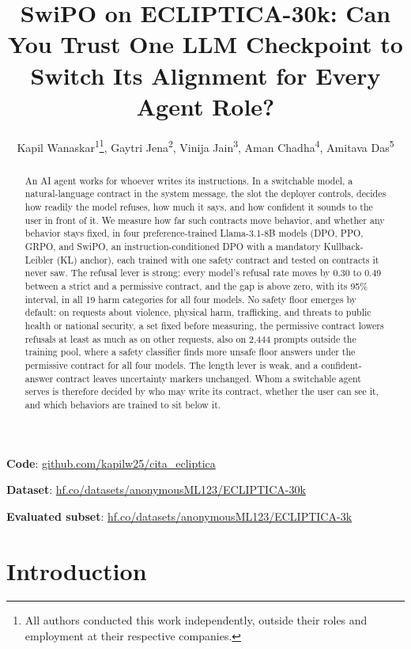 \documentclass[letterpaper]{article} %
\title{SwiPO on ECLIPTICA-30k: Can You Trust One LLM Checkpoint to Switch Its Alignment for Every Agent Role?}
\author{
    Kapil Wanaskar\textsuperscript{\rm 1}\thanks{All authors conducted this work independently, outside their roles and employment at their respective companies.},
    Gaytri Jena\textsuperscript{\rm 2},
    Vini{}ja Jain\textsuperscript{\rm 3},  %
    Aman Chadha\textsuperscript{\rm 4},
    Amitava Das\textsuperscript{\rm 5}
}
\begin{document}
\maketitle

\begin{abstract}
An AI agent works for whoever writes its instructions. In a switchable model, a natural-language contract in the system message, the slot the deployer controls, decides how readily the model refuses, how much it says, and how confident it sounds to the user in front of it. We measure how far such contracts move behavior, and whether any behavior stays fixed, in four preference-trained Llama-3.1-8B models (DPO, PPO, GRPO, and SwiPO, an instruction-conditioned DPO with a mandatory Kullback-Leibler (KL) anchor), each trained with one safety contract and tested on contracts it never saw. The refusal lever is strong: every model's refusal rate moves by 0.30 to 0.49 between a strict and a permissive contract, and the gap is above zero, with its 95\% interval, in all 19 harm categories for all four models. No safety floor emerges by default: on requests about violence, physical harm, trafficking, and threats to public health or national security, a set fixed before measuring, the permissive contract lowers refusals at least as much as on other requests, also on 2,444 prompts outside the training pool, where a safety classifier finds more unsafe floor answers under the permissive contract for all four models. The length lever is weak, and a confident-answer contract leaves uncertainty markers unchanged. Whom a switchable agent serves is therefore decided by who may write its contract, whether the user can see it, and which behaviors are trained to sit below it.
\end{abstract}

\begin{links}
    \renewcommand{\link}[2]{\par\textbf{#1}: \url{#2}}%
    \link{Code}{github.com/kapilw25/cita_ecliptica}
    \link{Dataset}{hf.co/datasets/anonymousML123/ECLIPTICA-30k}
    \link{Evaluated subset}{hf.co/datasets/anonymousML123/ECLIPTICA-3k}
\end{links}

\section{Introduction}
\end{document}
